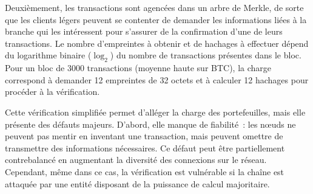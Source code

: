 Deuxièmement, les transactions sont agencées dans un arbre de Merkle, de sorte que les clients légers peuvent se contenter de demander les informations liées à la branche qui les intéressent pour s'assurer de la confirmation d'une de leurs transactions. Le nombre d'empreintes à obtenir et de hachages à effectuer dépend du logarithme binaire ($\log_{2}$) du nombre de transactions présentes dans le bloc. Pour un bloc de 3000 transactions (moyenne haute sur BTC), la charge correspond à demander 12 empreintes de 32 octets et à calculer 12 hachages pour procéder à la vérification.

Cette vérification simplifiée permet d'alléger la charge des portefeuilles, mais elle présente des défauts majeurs. D'abord, elle manque de fiabilité~: les nœuds ne peuvent pas mentir en inventant une transaction, mais peuvent omettre de transmettre des informations nécessaires. Ce défaut peut être partiellement contrebalancé en augmentant la diversité des connexions sur le réseau. Cependant, même dans ce cas, la vérification est vulnérable si la chaîne est attaquée par une entité disposant de la puissance de calcul majoritaire.

